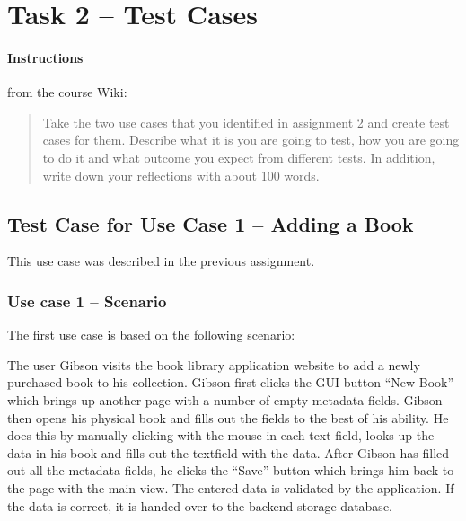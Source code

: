 %
%
%
%


\section{Task 2 -- Test Cases}

\paragraph{Instructions}\label{task-1-instructions}
from the course Wiki\cite{1dv600:lab3:instructions}:

\begin{quote}
    Take the two use cases that you identified in assignment 2 and create test
    cases for them. Describe what it is you are going to test, how you are
    going to do it and what outcome you expect from different tests. In
    addition, write down your reflections with about 100 words.
\end{quote}



\subsection{Test Case for Use Case 1 -- Adding a Book}\label{task-2a}
This use case was described in the previous assignment.

\subsubsection{Use case 1 -- Scenario}\label{task-2a}
The first use case is based on the following scenario:

The user Gibson visits the book library application website to add a newly
purchased book to his collection. Gibson first clicks the GUI button ``New
Book'' which brings up another page with a number of empty metadata fields.
Gibson then opens his physical book and fills out the fields to the best of his
ability. He does this by manually clicking with the mouse in each text field,
looks up the data in his book and fills out the textfield with the data.  After
Gibson has filled out all the metadata fields, he clicks the ``Save'' button
which brings him back to the page with the main view.
The entered data is validated by the application. If the data is correct, it is
handed over to the backend storage database.


